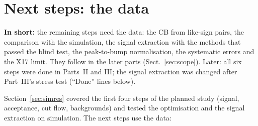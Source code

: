 \documentclass[11pt,a4paper]{article}
\newcommand{\inshort}[1]{\par\noindent\colorbox{black!5}{\parbox{\dimexpr\linewidth-2\fboxsep\relax}{\textbf{In short:} #1}}\par}
\begin{document}
\section{Next steps: the data}
\label{sec:next}
\inshort{the remaining steps need the data: the CB from like-sign pairs, the comparison with the simulation, the
signal extraction with the methods that passed the blind test, the peak-to-bump normalisation, the systematic errors
and the X17 limit. They follow in the later parts (Sect.~\ref{sec:scope}). Later: all six steps were done in Parts~II and
III; the signal extraction was changed after Part~III's stress test (``Done'' lines below).}
Section~\ref{sec:simres} covered the first four steps of the planned study (signal, acceptance,
cut flow, backgrounds) and tested the optimisation and the signal extraction on simulation. The
next steps use the data:
\end{document}
